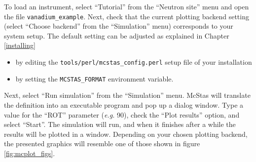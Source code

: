 To load an instrument, select ``Tutorial'' from the ``Neutron site''
menu and open the file \verb+vanadium_example+. Next, check that the current plotting backend setting
(select ``Choose backend'' from the ``Simulation'' menu) corresponds
to your system setup. The default setting can be adjusted as explained in Chapter \ref{installing}
\begin{itemize} 
\item{by editing
the \verb+tools/perl/mcstas_config.perl+ setup file of your
installation}
\item{by setting the \verb+MCSTAS_FORMAT+ environment
variable.}
\end{itemize} 
Next, select ``Run simulation'' from the ``Simulation'' menu.
McStas will translate the definition into an executable program and pop
up a dialog window. Type a value for the ``ROT'' parameter ({\em e.g.}
90), check the ``Plot results'' option, and select ``Start''. The
simulation will run, and when it finishes after a while the results will
be plotted in a window. Depending on your chosen plotting backend, the
presented graphics will resemble one of those shown in figure \ref{fig:mcplot_figs}.
